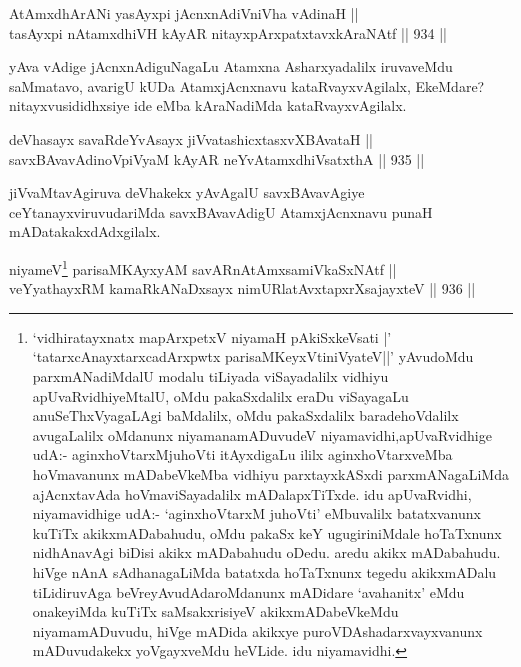 
\begin{shl}
AtAmxdhArANi yasAyxpi jAcnxnAdiVniVha vAdinaH || \\
tasAyxpi nA\s \s tamxdhiVH kAyAR nitayxpArxpatxtavxkAraNAtf \hfill || 934 ||  
\end{shl}

\begin{artha}
yAva vAdige jAcnxnAdiguNagaLu Atamxna Asharxyadalilx iruvaveMdu saMmatavo, avarigU kUDa AtamxjAcnxnavu kataRvayxvAgilalx, EkeMdare? nitayxvusididhxsiye ide eMba kAraNadiMda kataRvayxvAgilalx.
\end{artha}


\begin{shl}
deVhasayx savaRdeYvAsayx jiVvatashicxtasxvXBAvataH ||  \\
savxBAvavAdinoV\s piVyaM kAyAR neYvA\s \s tamxdhiVsatxthA \hfill || 935 ||  
\end{shl}

\begin{artha}
jiVvaMtavAgiruva deVhakekx yAvAgalU savxBAvavAgiye ceYtanayxviruvudariMda savxBAvavAdigU AtamxjAcnxnavu punaH mADatakakxdAdxgilalx.
\end{artha}



\begin{shl}
niyameV\footnote{`vidhiratayxnatx mapArxpetxV niyamaH pAkiSxkeVsati |' `tatarxcAnayxtarxcadArxpwtx parisaMKeyxVti\break niVyateV||' yAvudoMdu parxmANadiMdalU modalu tiLiyada viSayadalilx vidhiyu apUvaRvidhi\-yeMtalU, oMdu pakaSxdalilx eraDu viSayagaLu anuSeThxVyagaLAgi baMdalilx, oMdu pakaSxdalilx baradehoVdalilx avugaLalilx oMdanunx niyamanamADuvudeV niyamavidhi,\break apUvaRvidhige udA:- aginxhoVtarxMjuhoVti itAyxdigaLu ililx aginxhoVtarxveMba hoVmavanunx mADabeVkeMba vidhiyu parxtayxkASxdi parxmANagaLiMda ajAcnxtavAda hoVmaviSayadalilx mADalapxTiTxde. idu apUvaRvidhi, niyamavidhige udA:- `aginxhoVtarxM juhoVti' eMbuvalilx batatxvanunx kuTiTx akikxmADabahudu, oMdu pakaSx keY ugugiriniMdale hoTaTxnunx nidhAnavAgi biDisi akikx mADabahudu oDedu. aredu akikx mADabahudu. hiVge nAnA sAdhanagaLiMda batatxda hoTaTxnunx tegedu akikxmADalu tiLidiruvAga beVreyAvudAdaroMdanunx mADidare `avahanitx' eMdu onakeyiMda kuTiTx saMsakxrisiyeV akikxmADabeVkeMdu niyamamADuvudu, hiVge mADida akikxye puroVDAshadarxvayxvanunx mADuvudakekx yoVgayxveMdu heVLide. idu niyamavidhi.} parisaMKAyxyAM savARnAtAmxsamiVkaSxNAtf || \\
veYyathayxRM kamaRkANaDxsayx nimURlatAvxtapxrXsajayxteV \hfill || 936 ||  
\end{shl}

